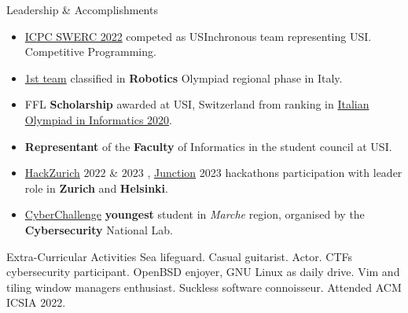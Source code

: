 \documentclass{cv} %
\begin{document}
\begin{rSection}{Leadership \& Accomplishments}
    \begin{itemize}
        \item \href{https://swerc.eu/2022/teams/}{ICPC SWERC 2022}
              competed as USInchronous team representing USI. Competitive Programming.

        \item \href{https://www.makerslab.it/olimpiadi-robotiche-ancona-2019/}{1st team}
              classified in \textbf{Robotics} Olympiad regional phase in Italy.

        \item FFL \textbf{Scholarship} awarded at USI, Switzerland from ranking in
              \href{https://www.olimpiadi-informatica.it/index.php/selezione-territoriale-20.html}{Italian Olympiad in Informatics 2020}.

        \item \textbf{Representant} of the \textbf{Faculty} of Informatics in the student council at USI.
        \item \href{https://hackzurich.com/}{HackZurich} $2022$ \& $2023$ , \href{https://www.junction2023.com/}{Junction} 2023
              hackathons participation with leader role in \textbf{Zurich} and \textbf{Helsinki}.

        \item \href{https://cyberchallenge.it/}{CyberChallenge} \textbf{youngest} student
              in \textit{Marche} region, organised by the \textbf{Cybersecurity} National Lab.
    \end{itemize}
\end{rSection}

\begin{rSection}{Extra-Curricular Activities}
    Sea lifeguard.
    Casual guitarist.
    Actor.
    CTFs cybersecurity participant.
    OpenBSD enjoyer, GNU \text{+} Linux as daily drive.
    Vim and tiling window managers enthusiast.
    Suckless software connoisseur.
    Attended ACM ICSIA 2022.
\end{rSection}
\end{document}
